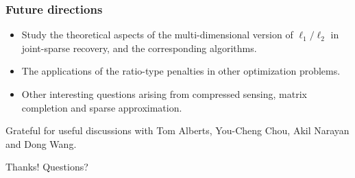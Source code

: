 \documentclass[11pt]{beamer}
\begin{document}
\begin{frame}
\frametitle{Future directions}

\begin{itemize}

\item Study the theoretical aspects of the multi-dimensional version of $\ell_1/\ell_2$ in joint-sparse recovery, and the corresponding algorithms.

\medskip

\item The applications of the ratio-type penalties in other optimization problems.

\medskip

\item Other interesting questions arising from compressed sensing, matrix completion and sparse approximation. 

\end{itemize}


\end{frame}








\begin{frame}

Grateful for useful discussions with Tom Alberts, You-Cheng Chou, Akil Narayan and Dong Wang. 

\bigskip

\bigskip

\bigskip

\bigskip


{\begin{center} \large {\color{blue}Thanks! Questions?} \end{center}}


\end{frame}
\end{document}
